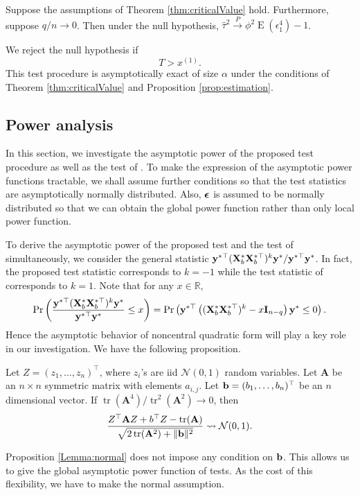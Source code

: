 \documentclass[smallextended]{svjour3}       %
\DeclareMathOperator{\mytr}{tr}
\DeclareMathOperator{\myE}{E}
\newcommand{\By}{\mathbf{y}}    \newcommand{\Bz}{\mathbf{z}}
\newcommand{\BA}{\mathbf{A}}    \newcommand{\BB}{\mathbf{B}}    \newcommand{\BC}{\mathbf{C}}    \newcommand{\BD}{\mathbf{D}}    \newcommand{\BE}{\mathbf{E}}    \newcommand{\BF}{\mathbf{F}}    \newcommand{\BG}{\mathbf{G}}    \newcommand{\BH}{\mathbf{H}}    \newcommand{\BI}{\mathbf{I}}    \newcommand{\BJ}{\mathbf{J}}    \newcommand{\BK}{\mathbf{K}}    \newcommand{\BL}{\mathbf{L}}
\begin{document}
\begin{proposition}\label{prop:estimation}
    Suppose the assumptions of Theorem \ref{thm:criticalValue} hold.
    Furthermore, suppose $q/n\to 0$.
    Then under the null hypothesis, $\hat \tau^2 \xrightarrow{P} \phi^{2} \myE (\epsilon_1^4)-1$.
\end{proposition}
We reject the null hypothesis if 
\begin{equation*}
    T > x^{(1)}.
\end{equation*}
This test procedure is asymptotically exact of size $\alpha$ under the conditions of Theorem \ref{thm:criticalValue} and Proposition \ref{prop:estimation}.


\subsection{Power analysis}\label{sec:Power}
In this section, we investigate the asymptotic power of the proposed test procedure as well as the test of \cite{Goeman2006}.
To make the expression of the asymptotic power functions tractable, we shall assume further conditions so that the test statistics are asymptotically normally distributed.
Also, $\boldsymbol{\epsilon}$ is assumed to be normally distributed so that we can obtain the global power function rather than only local power function.

To derive the asymptotic power of the proposed test and the test of \cite{Goeman2006} simultaneously, we consider the general statistic
    ${
\By^{*\top}
    (\BX_b^* \BX_b^{*\top})^{k} 
        \By^*
    }/{\By^{*\top} \By^*}$.
    In fact, the proposed test statistic corresponds to $k=-1$ while the test statistic of \cite{Goeman2006} corresponds to $k=1$.
    Note that for any $x\in \mathbb R$,
    \begin{equation*}
        \Pr\left( 
    \frac{
\By^{*\top}
    (\BX_b^* \BX_b^{*\top})^{k} 
        \By^*
    }{\By^{*\top} \By^*}
    \leq x
        \right)
        =
        \Pr\left( 
\By^{*\top}
\left( 
    (\BX_b^* \BX_b^{*\top})^{k} 
    -x\BI_{n-q}
\right)
        \By^*
    \leq 
    0
\right).
    \end{equation*}
Hence the asymptotic behavior of noncentral quadratic form will play a key role in our investigation.
We have the following proposition.
\begin{proposition}
    Let $Z=(z_1,\ldots, z_n)^\top$, where $z_i$'s are iid $\mathcal N(0,1)$ random variables.
    Let $\BA$ be an $n\times n$ symmetric matrix with elements $a_{i,j}$.
    Let $\mathbf{b}=(b_1,\ldots, b_n)^\top$ be an $n$ dimensional vector.
    If $\mytr(\BA^4)/\mytr^2(\BA^2)\to 0$,
    then
    \begin{equation*}
        \frac{Z^\top \BA Z + b^\top Z - \mytr(\BA)}{\sqrt{2\mytr(\BA^2)+\|\Bb\|^2}}
        \rightsquigarrow \mathcal N(0,1).
    \end{equation*}
    \label{Lemma:normal}
\end{proposition}
\begin{remark}
    Proposition \ref{Lemma:normal} does not impose any condition on $\mathbf{b}$.
    This allows us to give the global asymptotic power function of tests.
    As the cost of this flexibility, we have to make the normal assumption.
\end{remark}
\end{document}
